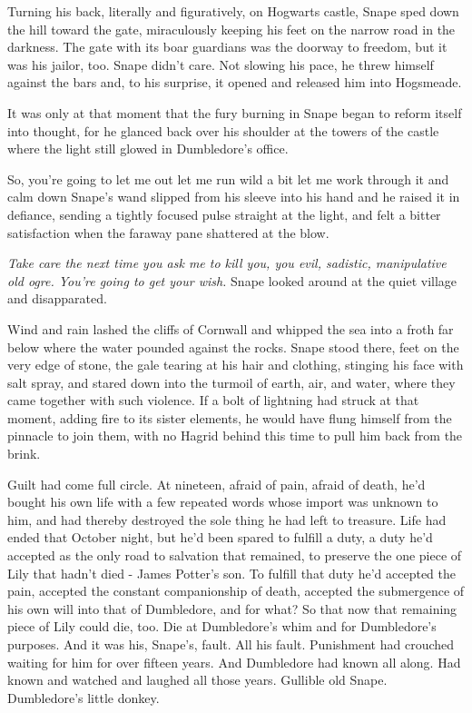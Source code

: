 Turning his back, literally and figuratively, on Hogwarts castle, Snape sped down the hill toward the gate, miraculously keeping his feet on the narrow road in the darkness. The gate with its boar guardians was the doorway to freedom, but it was his jailor, too. Snape didn't care. Not slowing his pace, he threw himself against the bars and, to his surprise, it opened and released him into Hogsmeade.

It was only at that moment that the fury burning in Snape began to reform itself into thought, for he glanced back over his shoulder at the towers of the castle where the light still glowed in Dumbledore's office.

So, you're going to let me out{\el} let me run wild a bit{\el} let me work through it and calm down{\el} Snape's wand slipped from his sleeve into his hand and he raised it in defiance, sending a tightly focused pulse straight at the light, and felt a bitter satisfaction when the faraway pane shattered at the blow.

\emph{Take care the next time you ask me to kill you, you evil, sadistic, manipulative old ogre. You're going to get your wish.} Snape looked around at the quiet village and disapparated.

Wind and rain lashed the cliffs of Cornwall and whipped the sea into a froth far below where the water pounded against the rocks. Snape stood there, feet on the very edge of stone, the gale tearing at his hair and clothing, stinging his face with salt spray, and stared down into the turmoil of earth, air, and water, where they came together with such violence. If a bolt of lightning had struck at that moment, adding fire to its sister elements, he would have flung himself from the pinnacle to join them, with no Hagrid behind this time to pull him back from the brink.

Guilt had come full circle. At nineteen, afraid of pain, afraid of death, he'd bought his own life with a few repeated words whose import was unknown to him, and had thereby destroyed the sole thing he had left to treasure. Life had ended that October night, but he'd been spared to fulfill a duty, a duty he'd accepted as the only road to salvation that remained, to preserve the one piece of Lily that hadn't died - James Potter's son. To fulfill that duty he'd accepted the pain, accepted the constant companionship of death, accepted the submergence of his own will into that of Dumbledore, and for what? So that now that remaining piece of Lily could die, too. Die at Dumbledore's whim and for Dumbledore's purposes. And it was his, Snape's, fault. All his fault. Punishment had crouched waiting for him for over fifteen years. And Dumbledore had known all along. Had known and watched and laughed all those years. Gullible old Snape. Dumbledore's little donkey.

